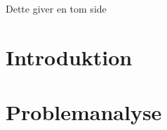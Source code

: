 
\raggedbottom



\frontmatter
%

\clearpage
\thispagestyle{empty}
{\color{white}Dette giver en tom side}
\clearpage

%

%

\tableofcontents* 

\mainmatter

\chapter{Introduktion}\vspace{-.75cm}

\chapter{Problemanalyse}\vspace{-.75cm}






\cleardoublepage

\begingroup
\label{litteraturliste}
\raggedright


\endgroup
\begin{appendices}
%	
%	
\end{appendices}


